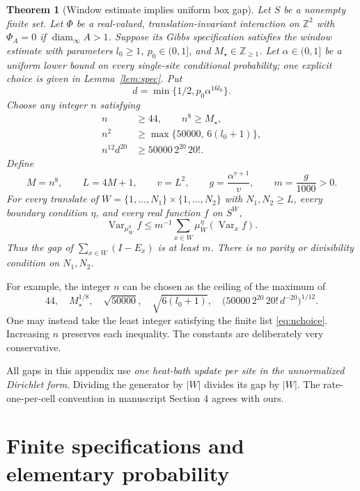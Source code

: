 \documentclass[11pt]{amsart}
\newtheorem{theorem}{Theorem}[section]
\theoremstyle{definition}
\newcommand{\Z}{\mathbb Z}
\newcommand{\Var}{\operatorname{Var}}
\newcommand{\1}{\mathbf 1}
\begin{document}
\begin{theorem}[Window estimate implies uniform box gap]
\label{thm:main}
Let $S$ be a nonempty finite set. Let $\Phi$ be a real-valued,
translation-invariant interaction on $\Z^2$ with
$\Phi_A=0$ if $\operatorname{diam}_\infty A>1$. Suppose its Gibbs
specification satisfies the window estimate with parameters
$l_0\ge1$, $p_0\in(0,1]$, and $M_\star\in\Z_{\ge1}$.
Let $\alpha\in(0,1]$ be a uniform lower bound on every single-site
conditional probability; one explicit choice is given in
Lemma~\ref{lem:spec}. Put
\[
 d=\min\{1/2,p_0\alpha^{16l_0}\}.
\]
Choose any integer $n$ satisfying
\begin{equation}\label{eq:nchoice}
 \begin{split}
 n&\ge44,\qquad n^8\ge M_\star,\\
 n^2&\ge\max\{50000,\,6(l_0+1)\},\\
 n^{12}d^{20}&\ge50000\,2^{20}\,20!.
 \end{split}
\end{equation}
Define
\begin{equation}\label{eq:constants}
 M=n^8,\qquad L=4M+1,\qquad v=L^2,\qquad
 g=\frac{\alpha^{v+1}}{v},\qquad m=\frac{g}{1000}>0.
\end{equation}
For every translate of
$W=\{1,\ldots,N_1\}\times\{1,\ldots,N_2\}$ with $N_1,N_2\ge L$,
every boundary condition $\eta$, and every real function $f$ on $S^W$,
\begin{equation}\label{eq:mainPI}
 \Var_{\mu_W^\eta} f
 \le m^{-1}\sum_{x\in W}\mu_W^\eta(\Var_x f).
\end{equation}
Thus the gap of $\sum_{x\in W}(I-E_x)$ is at least $m$.
There is no parity or divisibility condition on $N_1,N_2$.
\end{theorem}

For example, the integer $n$ can be chosen as the ceiling of the maximum of
\[
44,\quad M_\star^{1/8},\quad \sqrt{50000},\quad
\sqrt{6(l_0+1)},\quad
\bigl(50000\,2^{20}\,20!\,d^{-20}\bigr)^{1/12}.
\]
One may instead take the least integer satisfying the finite list
\eqref{eq:nchoice}. Increasing $n$ preserves each inequality. The constants
are deliberately very conservative.

All gaps in this appendix use \emph{one heat-bath update per site in the
unnormalized Dirichlet form}. Dividing the generator by $|W|$ divides its gap
by $|W|$. The rate-one-per-cell convention in manuscript Section 4 agrees
with ours.

\section{Finite specifications and elementary probability}
\label{sec:finite}
\end{document}
